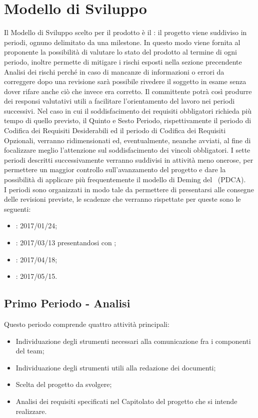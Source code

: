 \documentclass[../PianoDiProgetto_v4.0.0.tex]{subfiles}
\begin{document}
\section{Modello di Sviluppo}
Il Modello di Sviluppo scelto per il prodotto è il : il progetto viene suddiviso in periodi, ognuno delimitato da una milestone. In questo modo viene fornita al proponente la possibilità di valutare lo stato del prodotto al termine di ogni periodo, inoltre permette di mitigare i rischi esposti nella sezione precendente Analisi dei rischi perché in caso di mancanze di informazioni o errori da correggere dopo una revisione sarà possibile rivedere il soggetto in esame senza dover rifare anche ciò che invece era corretto. Il committente potrà così produrre dei responsi valutativi utili a facilitare l'orientamento del lavoro nei periodi successivi. Nel caso in cui il soddisfacimento dei requisiti obbligatori richieda più tempo di quello previsto, il Quinto e Sesto Periodo, rispettivamente il periodo di Codifica dei Requisiti Desiderabili ed il periodo di Codifica dei Requisiti Opzionali, verranno ridimensionati ed, eventualmente, neanche avviati, al fine di focalizzare meglio l'attenzione sul soddisfacimento dei vincoli obbligatori. I sette periodi descritti successivamente verranno suddivisi in attività meno onerose, per permettere un maggior controllo sull’avanzamento del progetto e dare la possibilità di applicare più frequentemente il modello di Deming del \ (PDCA).\\
I periodi sono organizzati in modo tale da permettere di presentarsi alle consegne delle revisioni previste, le scadenze che verranno rispettate per queste sono le seguenti:
	\begin{itemize}
		\item \revisionedeirequisiti: 2017/01/24;
		\item \revisionediprogettazione: 2017/03/13 presentandosi con \revisionediprogettazionemax;
		\item \revisionediqualifica: 2017/04/18;
		\item \revisionediaccettazione: 2017/05/15.
	\end{itemize}

	\subsection{Primo Periodo - Analisi}
	Questo periodo comprende quattro attività principali:

	\begin{itemize}
		\item Individuazione degli strumenti necessari alla comunicazione fra i componenti del team;
		\item Individuazione degli strumenti utili alla redazione dei documenti;
		\item Scelta del progetto da svolgere;
		\item Analisi dei requisiti specificati nel Capitolato del progetto che si intende realizzare.
	\end{itemize}
			
\end{document}
